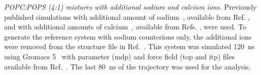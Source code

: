 \documentclass[journal=jpcbfk,manuscript=article]{achemso}
\newcommand{\todo}[1]{\textcolor{red}{#1}}
\begin{document}
\noindent
{\it POPC:POPS (4:1) mixtures with additional sodium and calcium ions.} 
Previously published simulations with additional amount of sodium~\cite{jurkiewicz12},
available from Ref. , and with additional amounts
of calcium~\cite{melcrova16}, available from Refs. ,
were used. To generate the reference system with sodium counterions only,
the additional ions were removed from the structure file in Ref.~.
This system was simulated 120~ns using Gromacs 5~\cite{abraham2015gromacs} with parameter (mdp)
and force field (top and itp) files available from Ref.~.
The last 80~ns of the trajectory was used for the analysis.
\end{document}
